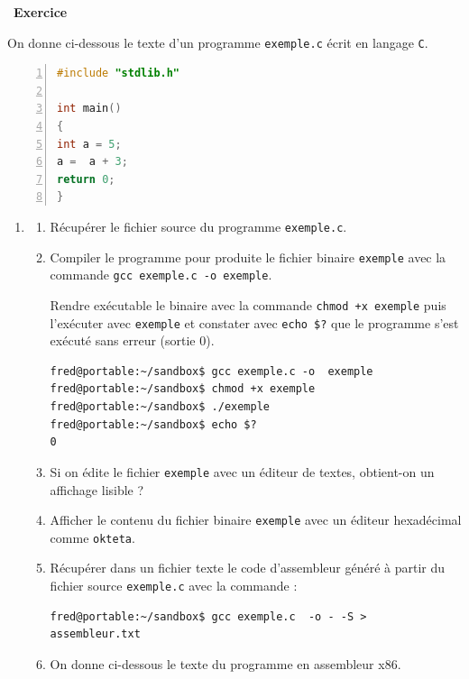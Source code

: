 \documentclass[a4paper, french, 11pt]{article}  %
\newcounter{exercice}
\newenvironment{exercice}[1]
{\par \medskip   \addtocounter{exercice}{1} \noindent  
\begin{bclogo}[arrondi =0.1,   noborder = true, logo=\bccrayon, marge=4]{~\textbf{Exercice} \textbf{\theexercice} {\itshape #1} }  \par}
{
\end{bclogo}
 \par \bigskip }
\newcounter{prog}
\begin{document}
\begin{exercice}{}

On donne ci-dessous le texte d'un programme \texttt{exemple.c} écrit  en langage \texttt{C}.

\begin{lstlisting}[language=C,numbers=left]
#include "stdlib.h"

int main()
{
int a = 5;
a =  a + 3;
return 0;
} 
\end{lstlisting}

\begin{enumerate}

\item 

\begin{enumerate}
	\item Récupérer le fichier source du programme \texttt{exemple.c}.
	\item Compiler le programme pour produite le fichier binaire \texttt{exemple} avec la commande \texttt{gcc exemple.c -o exemple}.
	
Rendre exécutable le binaire avec la commande \texttt{chmod +x exemple} puis l'exécuter avec \texttt{exemple} et constater avec \verb+echo $?+ que le programme s'est exécuté sans erreur (sortie $0$).

\begin{lstlisting}[style=compil]
fred@portable:~/sandbox$ gcc exemple.c -o  exemple
fred@portable:~/sandbox$ chmod +x exemple
fred@portable:~/sandbox$ ./exemple 
fred@portable:~/sandbox$ echo $?
0
\end{lstlisting}

	\item Si on édite le fichier \texttt{exemple} avec un éditeur de textes, obtient-on un affichage lisible ?
	\item Afficher le contenu du fichier binaire \texttt{exemple} avec un éditeur hexadécimal comme \texttt{okteta}.
	
	\item Récupérer dans un fichier texte le code d'assembleur généré à partir du  fichier source \texttt{exemple.c} avec la commande :

\begin{lstlisting}[style=compil]
fred@portable:~/sandbox$ gcc exemple.c  -o - -S > assembleur.txt
\end{lstlisting}

\item On donne ci-dessous le texte du programme en assembleur x86. 


\end{enumerate}
\end{enumerate}
\end{exercice}
\end{document}
